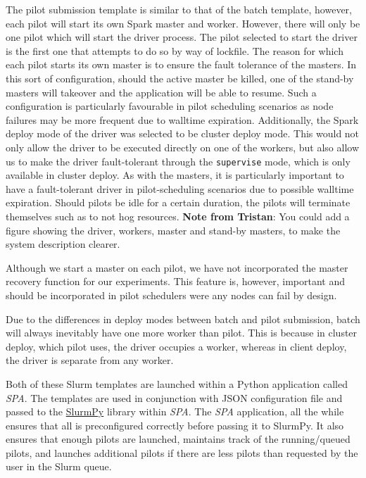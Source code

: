 \documentclass{IEEEtran}
\newcommand{\tristan}[1]{\color{red}\textbf{Note from Tristan}:
      #1 \color{black}}
\newcommand{\TG}[1]{\tristan{#1}}
\begin{document}
    The pilot submission template is similar to that of the batch template, however,
    each pilot will start its own Spark master and worker. However, there will only be one
    pilot which will start the driver process. The pilot selected to start the driver is the first one
    that attempts to do so by way of lockfile.
    The reason for 
    which each pilot starts its own master is to ensure the fault tolerance of the 
    masters. In this sort of configuration, should the active master be killed, one
    of the stand-by masters will takeover and the application will be able to 
    resume. Such a configuration is particularly favourable in pilot scheduling 
    scenarios as node failures may be more frequent due to walltime expiration.
    Additionally, the Spark deploy mode of the driver was selected to be cluster deploy mode.
    This would not only allow the driver to be executed directly on one of the workers,
    but also allow us to make the driver fault-tolerant through the
    \texttt{supervise} mode, which is only available in cluster deploy. As
    with the masters, it is particularly important to have a fault-tolerant
    driver in pilot-scheduling scenarios due to possible walltime
    expiration.
    Should pilots be idle for a certain duration, the
    pilots will terminate themselves such as to not hog resources.
    \TG{You could add a figure showing the driver, workers, master and stand-by masters, to make the system 
    description clearer.}

    Although we start a master on each pilot, we have not incorporated the master recovery function
    for our experiments. This feature is, however, important and should be incorporated in pilot schedulers
    were any nodes can fail by design.

    Due to the differences in deploy modes between batch and pilot submission, 
    batch will always inevitably have one more worker than pilot. This is because
    in cluster deploy, which pilot uses, the driver occupies a worker, whereas in
    client deploy, the driver is separate from any worker.

    Both of these Slurm templates are launched within a Python application called
    \textit{SPA}. The templates are used in conjunction with JSON configuration 
    file and passed to the \href{https://github.com/brentp/slurmpy}{SlurmPy} library within \textit{SPA}.
    The \textit{SPA} application, all the while ensures that all is preconfigured
    correctly before passing it to SlurmPy. It also ensures that enough pilots are
    launched, maintains track of the running/queued pilots, and launches additional
    pilots if there are less pilots than requested by the user in the Slurm queue.
\end{document}
